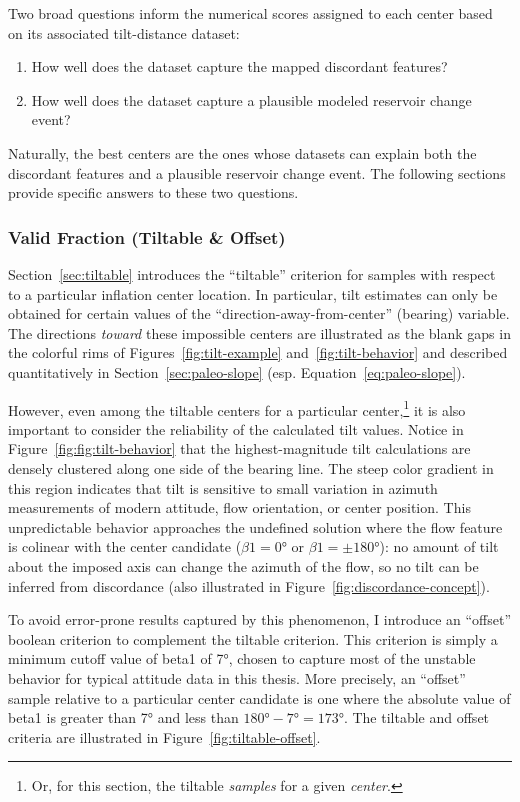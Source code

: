 Two broad questions inform the numerical scores assigned to each center based on its associated tilt-distance dataset:
\begin{enumerate}
    \item How well does the dataset capture the mapped discordant features?
    \item How well does the dataset capture a plausible modeled reservoir change event?
\end{enumerate}
Naturally, the best centers are the ones whose datasets can explain both the discordant features and a plausible reservoir change event. The following sections provide specific answers to these two questions. 

\subsubsection{Valid Fraction (Tiltable \& Offset)}\label{sec:valid-fraction}

Section~\ref{sec:tiltable} introduces the ``tiltable'' criterion for samples with respect to a particular inflation center location. In particular, tilt estimates can only be obtained for certain values of the ``direction-away-from-center'' (\acs{bearing}) variable. The directions \emph{toward} these impossible centers are illustrated as the blank gaps in the colorful rims of Figures~\ref{fig:tilt-example} and~\ref{fig:tilt-behavior} and described quantitatively in Section~\ref{sec:paleo-slope} (esp. Equation~\ref{eq:paleo-slope}).

However, even among the tiltable centers for a particular center,\footnote{Or, for this section, the tiltable \emph{samples} for a given \emph{center}.} it is also important to consider the reliability of the calculated tilt values. Notice in Figure~\ref{fig:fig:tilt-behavior} that the highest-magnitude tilt calculations are densely clustered along one side of the \acs{bearing} line. The steep color gradient in this region indicates that tilt is sensitive to small variation in azimuth measurements of modern attitude, flow orientation, or center position. This unpredictable behavior approaches the undefined solution where the flow feature is colinear with the center candidate ($\beta1=\ang{0}$ or $\beta1=\pm\ang{180}$): no amount of tilt about the imposed axis can change the azimuth of the flow, so no tilt can be inferred from discordance (also illustrated in Figure~\ref{fig:discordance-concept}).

To avoid error-prone results captured by this phenomenon, I introduce an ``offset'' boolean criterion to complement the tiltable criterion. This criterion is simply a minimum cutoff value of \acs{beta1} of \ang{7}, chosen to capture most of the unstable behavior for typical attitude data in this thesis. More precisely, an ``offset'' sample relative to a particular center candidate is one where the absolute value of \acs{beta1} is greater than \ang{7} and less than $\ang{180}-\ang{7}=\ang{173}$. The tiltable and offset criteria are illustrated in Figure~\ref{fig:tiltable-offset}.

